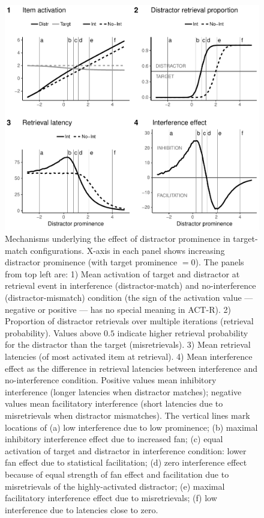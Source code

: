 \documentclass{cambridge7A}\usepackage[]{graphicx}\usepackage[]{color}
\begin{document}
\begin{subappendices}
\begin{figure}[!htbp]
\centering
%
\includegraphics[width=\textwidth]{figures/ensemble-lines-match}
%
 \caption{Mechanisms underlying the effect of distractor prominence in target-match configurations. 
 	X-axis in each panel shows increasing distractor prominence (with target prominence $=0$).
 	The panels from top left are:
 		1) Mean activation of target and distractor at retrieval event in interference (distractor-match) and no-interference (distractor-mismatch) condition (the sign of the activation value --- negative or positive --- has no special meaning in ACT-R).
 		2) Proportion of distractor retrievals over multiple iterations (retrieval probability). Values above $0.5$ indicate higher retrieval probability for the distractor than the target (misretrievals).
 		3) Mean retrieval latencies (of most activated item at retrieval).
 		4) Mean interference effect as the difference in retrieval latencies between interference and no-interference condition. Positive values mean inhibitory interference (longer latencies when distractor matches); negative values mean facilitatory interference (short latencies due to misretrievals when distractor mismatches).
 	The vertical lines mark locations of 
 		(a) low interference due to low prominence;
 		(b) maximal inhibitory interference effect due to increased fan;
 		(c) equal activation of target and distractor in interference condition: lower fan effect due to statistical facilitation;
 		(d) zero interference effect because of equal strength of fan effect and facilitation due to misretrievals of the highly-activated distractor;
 		(e) maximal facilitatory interference effect due to misretrievals;
 		(f) low interference due to latencies close to zero.
 		}
 \label{fig:promEnsMatch} 
\end{figure}




\end{subappendices}
\end{document}
